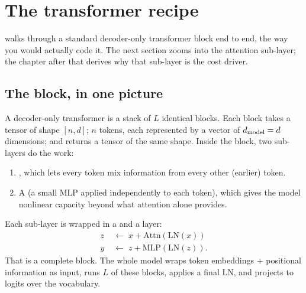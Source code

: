 \section{The transformer recipe}
\label{ch:transformer}

 walks through a standard decoder-only transformer
block end to end, the way you would actually code it. The next section zooms
into the attention sub-layer; the chapter after that derives why that
sub-layer is the cost driver.

\subsection{The block, in one picture}

A decoder-only transformer is a stack of \(L\) identical blocks. Each block
takes a tensor of shape \([n, d]\); \(n\) tokens, each represented by a
vector of \(d_{\text{model}} = d\) dimensions; and returns a tensor of the same
shape. Inside the block, two sub-layers do the work:

\begin{enumerate}
\item {}, which lets every token mix information from
every other (earlier) token.
\item A  (a small MLP applied
independently to each token), which gives the model nonlinear capacity
beyond what attention alone provides.
\end{enumerate}

Each sub-layer is wrapped in a  and a
 layer:
\begin{align}
  z &\;\leftarrow\; x + \text{Attn}(\text{LN}(x)) \\
  y &\;\leftarrow\; z + \text{MLP}(\text{LN}(z)).
  \label{eq:block}
\end{align}
That is a complete block. The whole model wraps token embeddings
+ positional information as input, runs \(L\) of these blocks, applies a
final LN, and projects to logits over the vocabulary.

